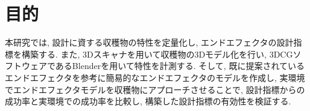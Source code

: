 \section{目的}
本研究では, 設計に資する収穫物の特性を定量化し, エンドエフェクタの設計指標を構築する.
また, 3Dスキャナを用いて収穫物の3Dモデル化を行い, 3DCGソフトウェアであるBlenderを用いて特性を計測する.
そして, 既に提案されているエンドエフェクタを参考に簡易的なエンドエフェクタのモデルを作成し, 実環境でエンドエフェクタモデルを収穫物にアプローチさせることで, 設計指標からの成功率と実環境での成功率を比較し, 構築した設計指標の有効性を検証する.
